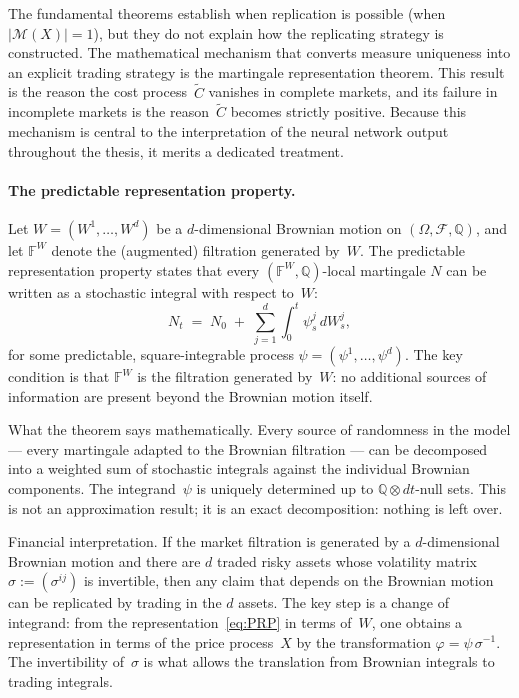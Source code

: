 The fundamental theorems establish when replication is possible
(when $|\mathcal{M}(X)| = 1$), but they do not explain how the
replicating strategy is constructed.  The mathematical mechanism that
converts measure uniqueness into an explicit trading strategy is the
martingale representation theorem.  This result is the reason the cost
process~$\tilde{C}$ vanishes in complete markets, and its failure in
incomplete markets is the reason~$\tilde{C}$ becomes strictly positive.
Because this mechanism is central to the interpretation of the neural
network output throughout the thesis, it merits a dedicated treatment.

\paragraph{The predictable representation property.}
Let $W = (W^1, \ldots, W^d)$ be a $d$-dimensional Brownian motion on
$(\Omega, \mathcal{F}, \mathbb{Q})$, and let $\mathbb{F}^W$ denote the
(augmented) filtration generated by~$W$.  The predictable representation
property states that every $(\mathbb{F}^W, \mathbb{Q})$-local martingale
$N$ can be written as a stochastic integral with respect to~$W$:
\begin{equation}
\label{eq:PRP}
N_t \;=\; N_0 \;+\; \sum_{j=1}^{d} \int_0^t \psi^j_s \, dW^j_s,
\end{equation}
for some predictable, square-integrable process
$\psi = (\psi^1, \ldots, \psi^d)$.  The key condition is that
$\mathbb{F}^W$ is the filtration generated by~$W$: no additional sources
of information are present beyond the Brownian motion itself.

\noindent What the theorem says mathematically.
Every source of randomness in the model --- every martingale adapted to
the Brownian filtration --- can be decomposed into a weighted sum of
stochastic integrals against the individual Brownian components.  The
integrand~$\psi$ is uniquely determined up to
$\mathbb{Q} \otimes dt$-null sets.  This is not an approximation result;
it is an exact decomposition: nothing is left over.

\noindent Financial interpretation.
If the market filtration is generated by a $d$-dimensional Brownian motion
and there are $d$ traded risky assets whose volatility matrix
$\sigma := (\sigma^{ij})$ is invertible, then any claim that depends on
the Brownian motion can be replicated by trading in the $d$ assets.  The
key step is a change of integrand: from the representation~\eqref{eq:PRP}
in terms of~$W$, one obtains a representation in terms of the price
process~$X$ by the transformation $\varphi = \psi \, \sigma^{-1}$.  The
invertibility of~$\sigma$ is what allows the translation from Brownian
integrals to trading integrals.

